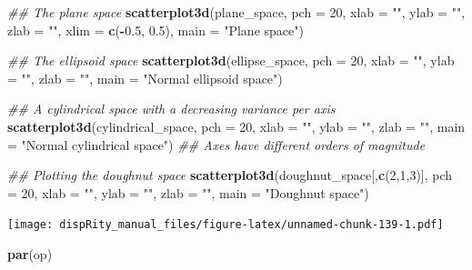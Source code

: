 \documentclass[
]{book}
\newenvironment{Shaded}{\begin{snugshade}}{\end{snugshade}}
\newcommand{\CommentTok}[1]{\textcolor[rgb]{0.56,0.35,0.01}{\textit{#1}}}
\newcommand{\DataTypeTok}[1]{\textcolor[rgb]{0.13,0.29,0.53}{#1}}
\newcommand{\DecValTok}[1]{\textcolor[rgb]{0.00,0.00,0.81}{#1}}
\newcommand{\FloatTok}[1]{\textcolor[rgb]{0.00,0.00,0.81}{#1}}
\newcommand{\KeywordTok}[1]{\textcolor[rgb]{0.13,0.29,0.53}{\textbf{#1}}}
\newcommand{\NormalTok}[1]{#1}
\newcommand{\OperatorTok}[1]{\textcolor[rgb]{0.81,0.36,0.00}{\textbf{#1}}}
\newcommand{\StringTok}[1]{\textcolor[rgb]{0.31,0.60,0.02}{#1}}
\begin{document}
\begin{Shaded}
\begin{Highlighting}[]
\CommentTok{\#\# The plane space}
\KeywordTok{scatterplot3d}\NormalTok{(plane\_space, }\DataTypeTok{pch =} \DecValTok{20}\NormalTok{, }\DataTypeTok{xlab =} \StringTok{""}\NormalTok{, }\DataTypeTok{ylab =} \StringTok{""}\NormalTok{, }\DataTypeTok{zlab =} \StringTok{""}\NormalTok{,}
              \DataTypeTok{xlim =} \KeywordTok{c}\NormalTok{(}\OperatorTok{{-}}\FloatTok{0.5}\NormalTok{, }\FloatTok{0.5}\NormalTok{), }\DataTypeTok{main =} \StringTok{"Plane space"}\NormalTok{)}

\CommentTok{\#\# The ellipsoid space}
\KeywordTok{scatterplot3d}\NormalTok{(ellipse\_space, }\DataTypeTok{pch =} \DecValTok{20}\NormalTok{, }\DataTypeTok{xlab =} \StringTok{""}\NormalTok{, }\DataTypeTok{ylab =} \StringTok{""}\NormalTok{, }\DataTypeTok{zlab =} \StringTok{""}\NormalTok{,}
              \DataTypeTok{main =} \StringTok{"Normal ellipsoid space"}\NormalTok{)}

\CommentTok{\#\# A cylindrical space with a decreasing variance per axis}
\KeywordTok{scatterplot3d}\NormalTok{(cylindrical\_space, }\DataTypeTok{pch =} \DecValTok{20}\NormalTok{, }\DataTypeTok{xlab =} \StringTok{""}\NormalTok{, }\DataTypeTok{ylab =} \StringTok{""}\NormalTok{, }\DataTypeTok{zlab =} \StringTok{""}\NormalTok{,}
              \DataTypeTok{main =} \StringTok{"Normal cylindrical space"}\NormalTok{)}
\CommentTok{\#\# Axes have different orders of magnitude}

\CommentTok{\#\# Plotting the doughnut space}
\KeywordTok{scatterplot3d}\NormalTok{(doughnut\_space[,}\KeywordTok{c}\NormalTok{(}\DecValTok{2}\NormalTok{,}\DecValTok{1}\NormalTok{,}\DecValTok{3}\NormalTok{)], }\DataTypeTok{pch =} \DecValTok{20}\NormalTok{, }\DataTypeTok{xlab =} \StringTok{""}\NormalTok{, }\DataTypeTok{ylab =} \StringTok{""}\NormalTok{,}
              \DataTypeTok{zlab =} \StringTok{""}\NormalTok{, }\DataTypeTok{main =} \StringTok{"Doughnut space"}\NormalTok{)}
\end{Highlighting}
\end{Shaded}

\texttt{[image: dispRity\_manual\_files/figure-latex/unnamed-chunk-139-1.pdf]}

\begin{Shaded}
\begin{Highlighting}[]
\KeywordTok{par}\NormalTok{(op)}
\end{Highlighting}
\end{Shaded}
\end{document}
